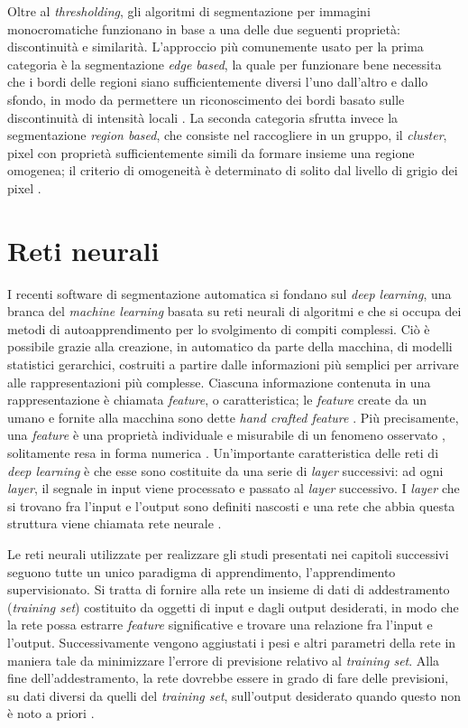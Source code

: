 Oltre al \textit{thresholding}, gli algoritmi di segmentazione per immagini monocromatiche funzionano in base a una delle due seguenti proprietà: discontinuità e similarità. L’approccio più comunemente usato per la prima categoria è la segmentazione \textit{edge based}, la quale per funzionare bene necessita che i bordi delle regioni siano sufficientemente diversi l’uno dall'altro e dallo sfondo, in modo da permettere un riconoscimento dei bordi basato sulle discontinuità di intensità locali \cite[700]{gonzalez}. La seconda categoria sfrutta invece la segmentazione \textit{region based}, che consiste nel raccogliere in un gruppo, il \textit{cluster}, pixel con proprietà sufficientemente simili da formare insieme una regione omogenea; il criterio di omogeneità è determinato di solito dal livello di grigio dei pixel \cite{Sharma2010}.

\section{Reti neurali} \label{retineurali}
I recenti software di segmentazione automatica si fondano sul \textit{deep learning}, una branca del \textit{machine learning} basata su reti neurali di algoritmi e che si occupa dei metodi di autoapprendimento per lo svolgimento di compiti complessi. Ciò è possibile grazie alla creazione, in automatico da parte della macchina, di modelli statistici gerarchici, costruiti a partire dalle informazioni più semplici per arrivare alle rappresentazioni più complesse. Ciascuna informazione contenuta in una rappresentazione è chiamata \textit{feature}, o caratteristica; le \textit{feature} create da un umano e fornite alla macchina sono dette \textit{hand crafted feature} \cite[11]{LaRosa}. Più precisamente, una \textit{feature} è una proprietà individuale e misurabile di un fenomeno osservato \cite{bishop, wiki:feature}, solitamente resa in forma numerica \cite{wiki:feature}. Un'importante caratteristica delle reti di \textit{deep learning} è che esse sono costituite da una serie di \textit{layer} successivi: ad ogni \textit{layer}, il segnale in input viene processato e passato al \textit{layer} successivo. I \textit{layer} che si trovano fra l'input e l'output sono definiti nascosti e una rete che abbia questa struttura viene chiamata rete neurale \cite[12]{LaRosa}.

Le reti neurali utilizzate per realizzare gli studi presentati nei capitoli successivi seguono tutte un unico paradigma di apprendimento, l'apprendimento supervisionato. Si tratta di fornire alla rete un insieme di dati di addestramento (\textit{training set}) costituito da oggetti di input e dagli output desiderati, in modo che la rete possa estrarre \textit{feature} significative e trovare una relazione fra l'input e l'output. Successivamente vengono aggiustati i pesi e altri parametri della rete in maniera tale da minimizzare l'errore di previsione relativo al \textit{training set}. Alla fine dell'addestramento, la rete dovrebbe essere in grado di fare delle previsioni, su dati diversi da quelli del \textit{training set}, sull'output desiderato quando questo non è noto a priori \cite{wiki:rete}.

